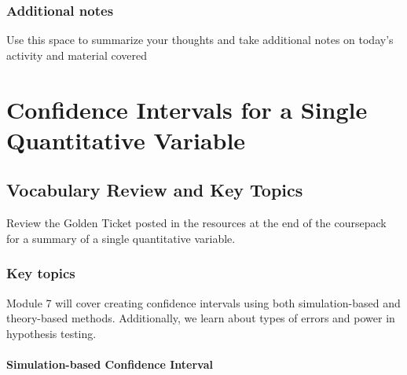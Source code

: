 \documentclass[
]{report}
\begin{document}
\subsection{Additional notes}\label{additional-notes-12}

Use this space to summarize your thoughts and take additional notes on today's activity and material covered

\newpage

\chapter{Confidence Intervals for a Single Quantitative Variable}\label{confidence-intervals-for-a-single-quantitative-variable}

\section{Vocabulary Review and Key Topics}\label{vocabulary-review-and-key-topics-5}

Review the Golden Ticket posted in the resources at the end of the coursepack for a summary of a single quantitative variable.

\subsection{Key topics}\label{key-topics-6}

Module 7 will cover creating confidence intervals using both simulation-based and theory-based methods. Additionally, we learn about types of errors and power in hypothesis testing.

\subsubsection*{Simulation-based Confidence Interval}\label{simulation-based-confidence-interval}
\end{document}

